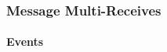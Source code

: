 \fi

\subsubsection{Message Multi-Receives}
\label{sec:multi-receive}

\paragraph{Events}
\label{sec:events}


